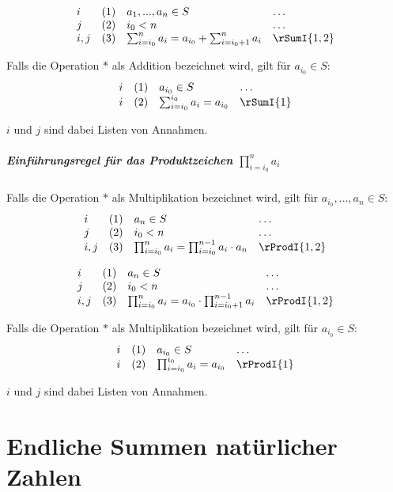 \documentclass{book}
\theoremstyle{plain}
\theoremstyle{remark}
\theoremstyle{definition}
\begin{document}
\[
\begin{array}{llll}
    i   & (1) & a_1,...,a_n \in S & \dots \\
    j   & (2) & i_0 < n & \dots \\
    i,j   & (3) & \sum_{i=i_0}^n a_i = a_{i_0}+\sum_{i=i_0+1}^{n} a_i  & \rSumI{1,2} 
\end{array}
\]

Falls die Operation \(\ast\) als Addition bezeichnet wird, gilt für \(a_{i_0} \in S\):
\[
\begin{array}{llll}
    i & (1) & a_{i_0} \in S & \dots \\
    i & (2) & \sum_{i=i_0}^{i_0} a_i = a_{i_0} & \rSumI{1}
\end{array}
\]

\(i\) und \(j\) sind dabei Listen von Annahmen.

\paragraph{Einführungsregel für das Produktzeichen \(\prod_{i=i_0}^n a_i\)}
Falls die Operation \(\ast\) als Multiplikation bezeichnet wird, gilt für \(a_{i_0}, \dots, a_n \in S\):
\[
\begin{array}{llll}
    i   & (1) & a_n \in S & \dots \\
    j   & (2) & i_0 < n & \dots \\
    i,j & (3) & \prod_{i=i_0}^n a_i = \prod_{i=i_0}^{n-1} a_i \cdot a_n & \rProdI{1,2}
\end{array}
\]

\[
\begin{array}{llll}
    i   & (1) & a_n \in S & \dots \\
    j   & (2) & i_0 < n & \dots \\
    i,j & (3) & \prod_{i=i_0}^n a_i = a_{i_0}\cdot \prod_{i=i_0+1}^{n-1} a_i & \rProdI{1,2}
\end{array}
\]

Falls die Operation \(\ast\) als Multiplikation bezeichnet wird, gilt für \(a_{i_0} \in S\):
\[
\begin{array}{llll}
    i & (1) & a_{i_0} \in S & \dots \\
    i & (2) & \prod_{i=i_0}^{i_0} a_i = a_{i_0} & \rProdI{1}
\end{array}
\]

\(i\) und \(j\) sind dabei Listen von Annahmen.

\chapter{Endliche Summen natürlicher Zahlen}
\end{document}
